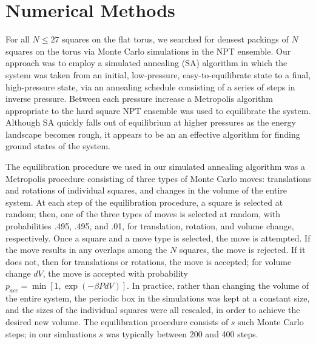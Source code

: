 \documentclass[aps]{revtex4}
\begin{document}
\section{Numerical Methods}
\label{sec:numerical}

For all $N \leq 27$ squares on the flat torus, we searched for densest packings of $N$ squares on the torus via Monte Carlo simulations in the NPT ensemble.  Our approach was to employ a simulated annealing (SA) algorithm in which the system was taken from an initial, low-pressure, easy-to-equilibrate state to a final, high-pressure state, via an annealing schedule consisting of a series of steps in inverse pressure.  Between each pressure increase a Metropolis algorithm appropriate to the hard square NPT ensemble was used to equilibrate the system.  Although SA quickly falls out of equilibrium at higher pressures as the energy landscape becomes rough, it appears to be an an effective algorithm for finding ground states of the system.  


The equilibration procedure we used in our simulated annealing algorithm was a Metropolis procedure consisting of three types of Monte Carlo moves:  translations and rotations of individual squares, and changes in the volume of the entire system.  At each step of the equilibration procedure, a square is selected at random; then, one of the three types of moves is selected at random, with probabilities .495, .495, and .01, for translation, rotation, and volume change, respectively.  Once a square and a move type is selected, the move is attempted.  If the move results in any overlaps among the $N$ squares, the move is rejected.  If it does not, then for translations or rotations, the move is accepted; for volume change $dV$, the move is accepted with probability $p_{acc}=\min[1,\exp(-\beta P dV)]$.  In practice, rather than changing the volume of the entire system, the periodic box in the simulations was kept at a constant size, and the sizes of the individual squares were all rescaled, in order to achieve the desired new volume. The equilibration procedure consists of $s$ such Monte Carlo steps; in our simluations $s$ was typically between 200 and 400 steps.  
\end{document}
